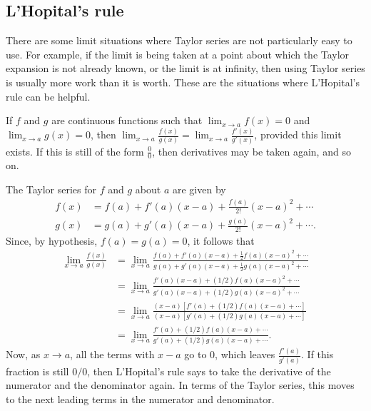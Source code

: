 \documentclass[twoside,openright,titlepage,a4paper]{book}
\begin{document}
\begin{sloppypar}
\subsection{L'Hopital's rule}

There are some limit situations where Taylor series are not particularly easy to use. For example, if the limit is being taken at a point about which the Taylor expansion is not already known, or the limit is at infinity, then using Taylor series is usually more work than it is worth. These are the situations where L'Hopital's rule can be helpful.
\begin{definitionbox}[title=\textbf{L'Hopital's Rule, $\frac{0}{0}$ case}]
If $f$ and $g$ are continuous functions such that $\displaystyle \lim_{x \rightarrow a} f(x) = 0$ and $\displaystyle\lim_{x \rightarrow a} g(x) = 0$, then $\displaystyle \lim_{x \rightarrow a} \frac{f(x)}{g(x)} = \lim_{x\rightarrow a} \frac{f'(x)}{g'(x)}$, provided this limit exists. If this is still of the form $\frac{0}{0}$, then derivatives may be taken again, and so on.
\end{definitionbox}

\begin{examplebox}
The Taylor series for $f$ and $g$ about $a$ are given by
\begin{align*}
f(x) &= f(a) + f'(a)(x-a) + \frac{f(a)}{2!}(x-a)^2+ \dotsb \\
g(x) &= g(a) + g'(a)(x-a) + \frac{g(a)}{2!}(x-a)^2 + \dotsb. 
\end{align*}
Since, by hypothesis, $f(a) = g(a) = 0$, it follows that
\begin{align*}
\lim_{x\rightarrow a} \frac{f(x)}{g(x)} &= \lim_{x \rightarrow a} \frac{ f(a) + f'(a)(x-a) + \frac{1}{2}f(a)(x-a)^2 + \dotsb}{g(a) + g'(a)(x-a) + \frac{1}{2}g(a)(x-a)^2+\dotsb} \\
&= \lim_{x\rightarrow a} \frac{f'(a) (x-a) +(1/2)f(a)(x-a)^2 + \dotsb}{g'(a)(x-a) + (1/2)g(a)(x-a)^2+ \dotsb} \\
&= \lim_{x \rightarrow a} \frac{(x-a)\left[f'(a) + (1/2)f(a)(x-a) + \dotsb \right]}{(x-a)\left[g'(a) + (1/2)g(a)(x-a) + \dotsb \right]} \\
&= \lim_{x \rightarrow a} \frac{f'(a) + (1/2)f(a)(x-a) + \dotsb }{g'(a) + (1/2) g(a)(x-a) + \dotsb}.
\end{align*}
Now, as $x \rightarrow a$, all the terms with $x-a$ go to 0, which leaves $\frac{f'(a)}{g'(a)}$. If this fraction is still $0/0$, then L'Hopital's rule says to take the derivative of the numerator and the denominator again. In terms of the Taylor series, this moves to the next leading terms in the numerator and denominator.
\end{examplebox}


\end{sloppypar}
\end{document}
